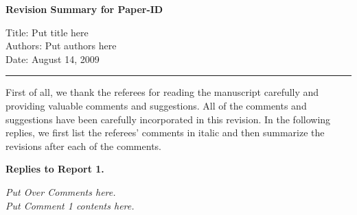 \documentclass[11pt,a4paper]{article}
\begin{document}

%
%


\pagebreak[4]

\begin{center}
\large{\bf Revision Summary for Paper-ID}


Title: Put title here\\
Authors: Put authors here\\
Date: August 14, 2009\ \\ \rule{5.4in}{0.02in}

\end{center}

\noindent First of all, we thank the referees for reading the
manuscript carefully and providing valuable comments and
suggestions. All of the comments and suggestions have been carefully
incorporated in this revision. In the following replies, we first list
the referees' comments in italic and then summarize the revisions
after each of the comments.\\


\begin{center} \textbf{\large Replies to Report 1.} \end{center}

{\it Put Over Comments here.}\\


 {\it Put Comment 1 contents here.}\\
\end{document}
